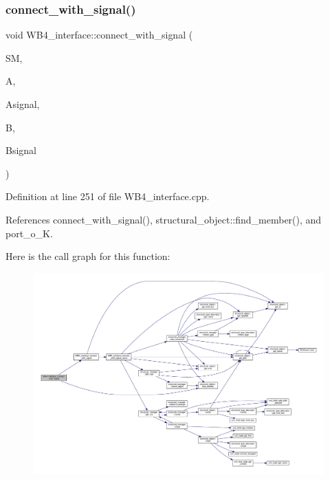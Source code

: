\subsubsection{\texorpdfstring{connect\+\_\+with\+\_\+signal()}{connect\_with\_signal()}\hspace{0.1cm}{\footnotesize\ttfamily [2/4]}}
{\footnotesize\ttfamily void W\+B4\+\_\+interface\+::connect\+\_\+with\+\_\+signal (\begin{DoxyParamCaption}\item[{\hyperlink{structural__manager_8hpp_ab3136f0e785d8535f8d252a7b53db5b5}{structural\+\_\+manager\+Ref}}]{SM,  }\item[{\hyperlink{structural__objects_8hpp_a8ea5f8cc50ab8f4c31e2751074ff60b2}{structural\+\_\+object\+Ref}}]{A,  }\item[{std\+::string}]{Asignal,  }\item[{\hyperlink{structural__objects_8hpp_a8ea5f8cc50ab8f4c31e2751074ff60b2}{structural\+\_\+object\+Ref}}]{B,  }\item[{std\+::string}]{Bsignal }\end{DoxyParamCaption})\hspace{0.3cm}{\ttfamily [protected]}}



Definition at line 251 of file W\+B4\+\_\+interface.\+cpp.



References connect\+\_\+with\+\_\+signal(), structural\+\_\+object\+::find\+\_\+member(), and port\+\_\+o\+\_\+K.

Here is the call graph for this function\+:
\nopagebreak
\begin{figure}[H]
\begin{center}
\leavevmode
\includegraphics[width=350pt]{d5/d7a/classWB4__interface_ab9486d63109bdb72a6b342e39bd50777_cgraph}
\end{center}
\end{figure}
\mbox{\label{classWB4__interface_a1907373293fa2624bdb543f6e2dea8ac}} 
